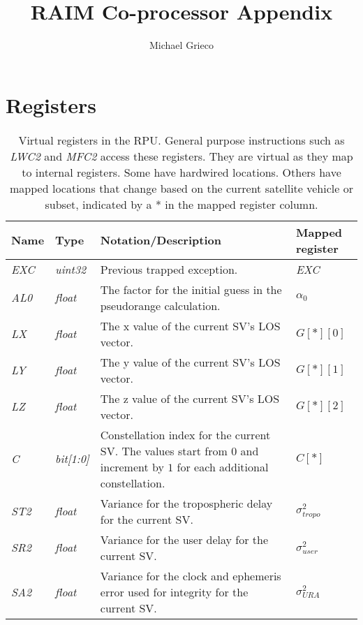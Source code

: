 \documentclass[11pt]{article}
\title{RAIM Co-processor Appendix}
\author{Michael Grieco}
\date{}
\begin{document}
\section{Registers}

\begin{table}[htbp] \begin{center}
  \caption{Virtual registers in the RPU. General purpose instructions such as \emph{LWC2} and \emph{MFC2} access these registers. They are virtual as they map to internal registers. Some have hardwired locations. Others have mapped locations that change based on the current satellite vehicle or subset, indicated by a * in the mapped register column.}
  \label{tab:rpu_virtual_registers}
  \begin{tabular}{|m{1.5cm}|m{2cm}|m{6cm}|m{1.5cm}|}
    \hline
    \textbf{Name} & \textbf{Type} & \textbf{Notation/Description} & \textbf{Mapped register}\\ \hline

    \emph{EXC} & \emph{uint32} & Previous trapped exception. & \emph{EXC}\\ \hline

    \emph{AL0} & \emph{float} & The factor for the initial guess in the pseudorange calculation. & $\alpha_0$\\ \hline

    \emph{LX} & \emph{float} & The x value of the current SV's LOS vector. & $G[*][0]$\\ \hline
    \emph{LY} & \emph{float} & The y value of the current SV's LOS vector. & $G[*][1]$\\ \hline
    \emph{LZ} & \emph{float} & The z value of the current SV's LOS vector. & $G[*][2]$\\ \hline

    \emph{C} & \emph{bit[1:0]} & Constellation index for the current SV. The values start from $0$ and increment by $1$ for each additional constellation. & $C[*]$\\ \hline

    \emph{ST2} & \emph{float} & Variance for the tropospheric delay for the current SV. & $\sigma_{tropo}^2$\\ \hline

    \emph{SR2} & \emph{float} & Variance for the user delay for the current SV. & $\sigma_{user}^2$\\ \hline

    \emph{SA2} & \emph{float} & Variance for the clock and ephemeris error used for integrity for the current SV. & $\sigma_{URA}^2$\\ \hline


\end{tabular}
\end{center}
\end{table}
\end{document}

